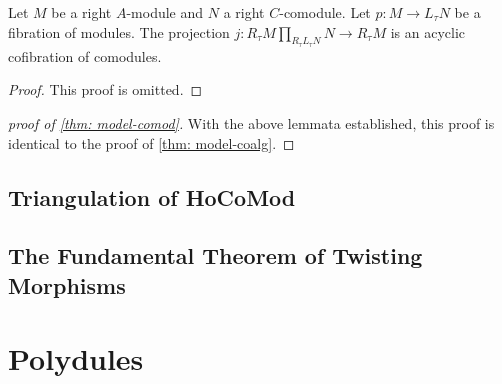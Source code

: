 \documentclass[../thesis.tex]{subfiles}
\begin{document}
            \begin{lemma}
                Let $M$ be a right $A$-module and $N$ a right $C$-comodule. Let $p : M \rightarrow L_\tau N$ be a fibration of modules. The projection $j : R_\tau M \prod_{R_\tau L_\tau N} N \rightarrow R_\tau M$ is an acyclic cofibration of comodules.
            \end{lemma}

            \begin{proof}
                This proof is omitted.
            \end{proof}

            \begin{proof}[proof of \ref{thm: model-comod}]
                With the above lemmata established, this proof is identical to the proof of \ref{thm: model-coalg}.
            \end{proof}

        \subsection{Triangulation of HoCoMod}

        \subsection{The Fundamental Theorem of Twisting Morphisms}

    \section{Polydules}
\end{document}
